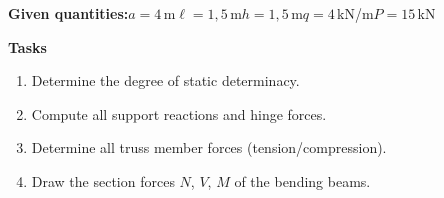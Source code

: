 \documentclass[a4paper,11pt]{article}
\begin{document}
\textbf{Given quantities:}\quad $a=4$\,m\quad $\ell=1,5$\,m\quad $h=1,5$\,m\quad $q=4$\,kN/m\quad $P=15$\,kN
\par\medskip
\textbf{Tasks}\par
\begin{enumerate}[label=\textbf{\arabic*.}]
  \item Determine the degree of static determinacy.
  \item Compute all support reactions and hinge forces.
  \item Determine all truss member forces (tension/compression).
  \item Draw the section forces $N$, $V$, $M$ of the bending beams.
\end{enumerate}
\end{document}
